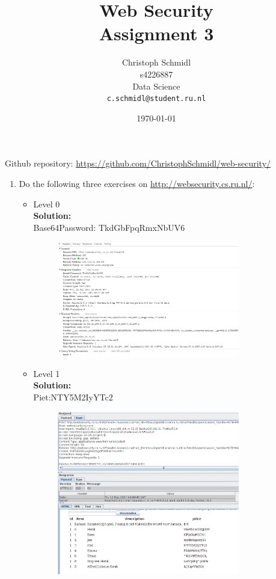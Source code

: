 \documentclass[a4paper]{article}
\title{Web Security\\Assignment 3}
\author{
  Christoph Schmidl\\ s4226887\\ Data Science\\      \texttt{c.schmidl@student.ru.nl}
}
\date{\today}
\begin{document}
\maketitle

Github repository: \url{https://github.com/ChristophSchmidl/web-security/}

\begin{enumerate}

\item Do the following three exercises on \url{http://websecurity.cs.ru.nl/}:

	\begin{itemize}
		\item Level 0\\
		\textbf{Solution:}\\
		
		Base64Password: TkdGbFpqRmxNbUV6		
		
		\begin{figure}[H]
	    \centering
  	    \includegraphics[width=0.8\textwidth]{img/level_0.PNG}
	    \end{figure}			
		
		\item Level 1\\
		\textbf{Solution:}\\
		
		Piet:NTY5M2IyYTc2
		
		\begin{figure}[H]
	    \centering
  	    \includegraphics[width=0.8\textwidth]{img/level_1.PNG}
	    \end{figure}		
		

\end{itemize}
\end{enumerate}
\end{document}
